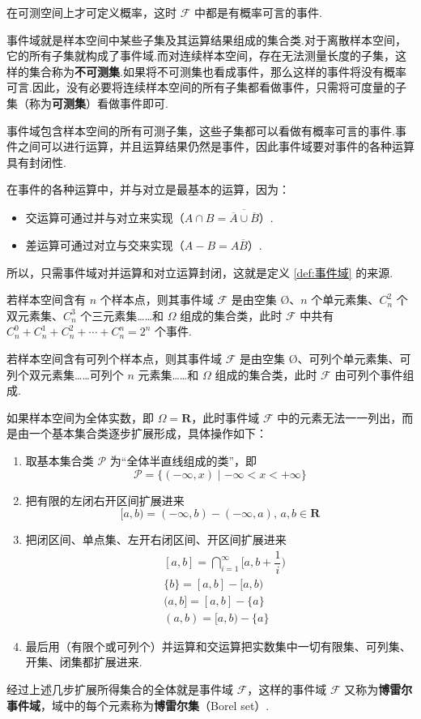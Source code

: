在可测空间上才可定义概率，这时 $\mathcal{F}$ 中都是有概率可言的事件.

\begin{note}
    \indent 事件域就是样本空间中某些子集及其运算结果组成的集合类.对于离散样本空间，它的所有子集就构成了事件域.而对连续样本空间，存在无法测量长度的子集，这样的集合称为\textbf{不可测集}.如果将不可测集也看成事件，那么这样的事件将没有概率可言.因此，没有必要将连续样本空间的所有子集都看做事件，只需将可度量的子集（称为\textbf{可测集}）看做事件即可.

    \indent 事件域包含样本空间的所有可测子集，这些子集都可以看做有概率可言的事件.事件之间可以进行运算，并且运算结果仍然是事件，因此事件域要对事件的各种运算具有封闭性.

    \indent 在事件的各种运算中，并与对立是最基本的运算，因为：
    \begin{itemize}
        \item 交运算可通过并与对立来实现（$A \cap B = \overline{\overline{A} \cup \overline{B}}$）.
        \item 差运算可通过对立与交来实现（$A-B = A \overline{B}$）.
    \end{itemize}
    所以，只需事件域对并运算和对立运算封闭，这就是定义 \ref{def:事件域} 的来源.
\end{note}

若样本空间含有 $n$ 个样本点，则其事件域 $\mathcal{F}$ 是由空集 $\text{\O}$、$n$ 个单元素集、$C_n^2$ 个双元素集、$C_n^3$ 个三元素集……和 $\varOmega$ 组成的集合类，此时 $\mathcal{F}$ 中共有 $C_n^0 + C_n^1 + C_n^2 + \cdots + C_n^n = 2^n$ 个事件.

若样本空间含有可列个样本点，则其事件域 $\mathcal{F}$ 是由空集 $\text{\O}$、可列个单元素集、可列个双元素集……可列个 $n$ 元素集……和 $\varOmega$ 组成的集合类，此时 $\mathcal{F}$ 由可列个事件组成.

如果样本空间为全体实数，即 $\varOmega = \mathbf{R}$，此时事件域 $\mathcal{F}$ 中的元素无法一一列出，而是由一个基本集合类逐步扩展形成，具体操作如下：
\begin{enumerate}
    \item 取基本集合类 $\mathcal{P}$ 为“全体半直线组成的类”，即
    $$
    \mathcal{P} = \{ (-\infty, x) \mid -\infty < x < +\infty \}
    $$
    \item 把有限的左闭右开区间扩展进来
    $$
    [a,b) = (-\infty,b) - (-\infty,a), \, a,b \in \mathbf{R}
    $$
    \item 把闭区间、单点集、左开右闭区间、开区间扩展进来
    $$
    \begin{aligned}
        & [a,b] = \bigcap_{i=1}^{\infty} \Big[ a, b + \dfrac{1}{i} \Big) \\
        & \{ b \} = [a,b] - [a,b) \\
        & (a,b] = [a,b] - \{ a \} \\
        & (a,b) = [a,b) - \{ a \}
    \end{aligned}
    $$
    \item 最后用（有限个或可列个）并运算和交运算把实数集中一切有限集、可列集、开集、闭集都扩展进来.
\end{enumerate}
经过上述几步扩展所得集合的全体就是事件域 $\mathcal{F}$，这样的事件域 $\mathcal{F}$ 又称为\textbf{博雷尔事件域}，域中的每个元素称为\textbf{博雷尔集}（Borel set）.


